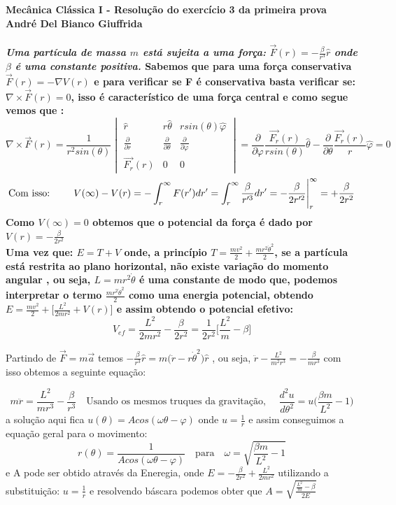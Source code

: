 \documentclass[a4paper,12pt]{exam}
\begin{document}
	\begingroup 
	  \bf Mecânica Clássica I - Resolução do exercício 3 da primeira prova\\
	  \indent André Del Bianco Giuffrida
	\endgroup
	\\ 
	\\ 
	\indent \textit{ Uma partícula de massa $m$ está sujeita a uma força:}
		$ \vec{F}(r)= -\frac{\beta}{r^3}\hat{r} $ \textit{ onde $\beta$ é uma constante positiva.}
		\indent Sabemos que para uma força conservativa $\vec{F}(r)= - \nabla V(r)$ e para verificar se F é conservativa basta verificar se: $\nabla \times \vec{F}(r) = 0$, isso é característico de uma força central e como segue vemos que :
		\[ \nabla \times \vec{F}(r) = \frac{1}{r^2 sin(\theta)}
			\begin{vmatrix}
				\hat{r} & r \hat{\theta} & rsin(\theta)\hat{\varphi} \\
				\frac{\partial}{\partial r} & \frac{\partial}{\partial \theta} & \frac{\partial}{\partial \varphi} \\
				\vec{F_r}(r) & 0 & 0 
			\end{vmatrix}
		= \frac{\partial}{\partial \varphi} \frac{\vec{F_r}(r)}{r sin(\theta)}\hat{\theta} -  \frac{\partial}{\partial \theta} \frac{\vec{F_r}(r)}{r} \hat{\varphi} = 0
		\] 
		\[ \text{Com isso: \quad \quad} V(\infty) - V(r) = - \int_{r}^{\infty} F(r')dr' = \int_{r}^{\infty} \frac{\beta}{r'^3} dr' = -\frac{\beta}{2r'^2} \Bigg|_{r}^{\infty} = +\frac{\beta}{2r^2}\]
		Como $V(\infty) = 0$ obtemos que o potencial da força é dado por $ V(r) = -\frac{\beta}{2r^2} $
		\\
		Uma vez que: $E = T + V$ onde, a princípio $T = \frac{mv^2}{2} + \frac{mr^2\dot\theta^2}{2}$, se a partícula está restrita ao plano horizontal, não existe variação do momento angular , ou seja, $L = m r^2 \dot\theta$ é uma constante de modo que, podemos interpretar o termo $\frac{mr^2\dot\theta^2}{2}$ como uma energia potencial, obtendo $E = \frac{mv^2}{2} + \big[\frac{ L^2 }{2mr^2} + V(r) \big]$ e assim obtendo o potencial efetivo:
		\[ V_{ef} = \frac{ L^2 }{2mr^2} - \frac{\beta}{2r^2}  = \frac{1}{2r^2} \Bigg[\frac{L^2}{m} - \beta \Bigg] \]
		
		Partindo de $\vec{F} = m\vec{a}$ temos $-\frac{\beta}{r^3}\hat{r} = m \big(\ddot{r} - r\dot{\theta}^2 \big)\hat{r} $ , ou seja, $ \ddot{r} - \frac{L^2}{m^2 r^3} = -\frac{\beta}{mr^3}$ com isso obtemos a seguinte equação:
		
		\[ m\ddot{r} = \frac{L^2}{mr^3} - \frac{\beta}{r^3} \quad \text{
		Usando os mesmos truques da gravitação, } \quad \frac{d^2u}{d\theta^2}  = u \Big( \frac{\beta m}{L^2} - 1 \Big) \]
		a solução aqui fica $ u(\theta) = Acos(\omega \theta - \varphi) $ onde $u=\frac{1}{r}$ e assim conseguimos a equação geral para o movimento:
		\[ r(\theta) = \frac{1}{Acos(\omega \theta - \varphi)} \quad \text{para} \quad \omega = \sqrt{\frac{\beta m}{L^2} - 1} \]
		e A pode ser obtido através da Eneregia, onde $E = -\frac{\beta}{2r^2} + \frac{L^2}{2mr^2}$ utilizando a substituição: $u = \frac{1}{r}$ e resolvendo báscara podemos obter que $A = \sqrt{\frac{\frac{L^2}{m} - \beta}{2E}}$
		
\end{document}
